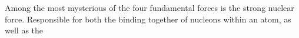Among the most mysterious of the four fundamental forces is the strong nuclear force. Responsible for both the binding together of nucleons within an atom, as well as the 